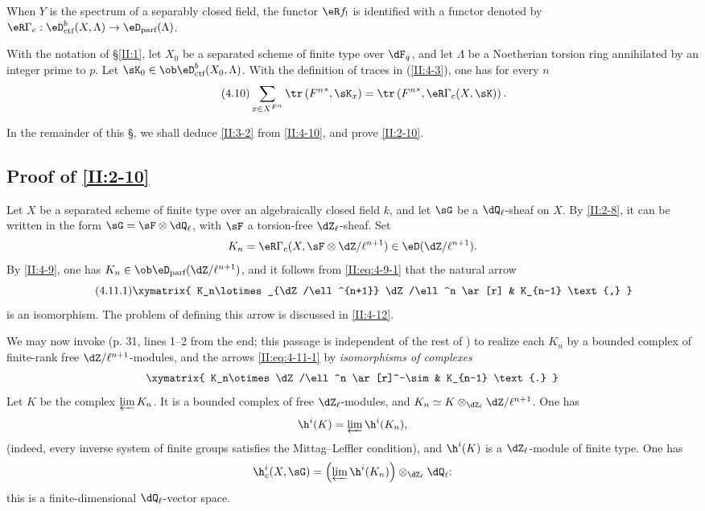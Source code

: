 When $Y$ is the spectrum of a separably closed field, the functor $\eR f_!$
is identified with a functor denoted by
$\eR \Gamma_c : \eD_\text{ctf}^b(X,\Lambda)\to\eD_\text{parf}(\Lambda)$.






\begin{theorem_}\label{II:4-10}
With the notation of \S\ref{II:1}, let $X_0$ be a separated scheme of finite
type over $\dF_q$, and let $\Lambda$ be a Noetherian torsion ring annihilated
by an integer prime to $p$. Let
$\sK_0\in\ob\eD_\textnormal{ctf}^b(X_0,\Lambda)$. With the definition of
traces in (\ref{II:4-3}), one has for every $n$
\begin{equation*}\tag{4.10}\label{II:eq:4-10}
  \sum_{x\in X^{F^n}} \tr\left({F^n}^*,\sK_x\right) = \tr\left({F^n}^*,\eR\Gamma_c(X,\sK)\right) \text{.}
\end{equation*}
\end{theorem_}

In the remainder of this \S, we shall deduce \ref{II:3-2} from
\ref{II:4-10}, and prove \ref{II:2-10}.






\subsection{Proof of \texorpdfstring{\ref{II:2-10}}{2.10}}\label{II:4-11}

Let $X$ be a separated scheme of finite type over an algebraically closed
field $k$, and let $\sG$ be a $\dQ_\ell$-sheaf on $X$. By \ref{II:2-8}, it
can be written in the form $\sG=\sF\otimes\dQ_\ell$, with $\sF$ a
torsion-free $\dZ_\ell$-sheaf. Set
\[
  K_n = \eR \Gamma_c(X,\sF\otimes\dZ/\ell^{n+1})\in\eD(\dZ/\ell^{n+1}) \text{.}
\]
By \ref{II:4-9}, one has
$K_n\in\ob\eD_\text{parf}(\dZ/\ell^{n+1})$, and it follows from
\eqref{II:eq:4-9-1} that the natural arrow
\begin{equation*}\tag{4.11.1}\label{II:eq:4-11-1}
\xymatrix{
  K_n\lotimes_{\dZ/\ell^{n+1}} \dZ/\ell^n \ar[r] & K_{n-1} \text{,}
}
\end{equation*}
is an isomorphism. The problem of defining this arrow is discussed in
\ref{II:4-12}.

We may now invoke \cite[XV.3.3]{sga5} (p. 31, lines 1--2 from the end; this
passage is independent of the rest of \cite{sga5}) to realize each $K_n$ by
a bounded complex of finite-rank free $\dZ/\ell^{n+1}$-modules, and the
arrows \eqref{II:eq:4-11-1} by \emph{isomorphisms of complexes}
\[\xymatrix{
  K_n\otimes \dZ/\ell^n \ar[r]^-\sim
    & K_{n-1} \text{.}
}\]
Let $K$ be the complex $\varprojlim K_n$. It is a bounded complex of free
$\dZ_\ell$-modules, and
$K_n\simeq K\otimes_{\dZ_\ell}\dZ/\ell^{n+1}$. One has
\[
  \h^i(K) = \varprojlim \h^i(K_n) \text{,}
\]
(indeed, every inverse system of finite groups satisfies the Mittag--Leffler
condition), and $\h^i(K)$ is a $\dZ_\ell$-module of finite type. One has
\[
  \h_c^i(X,\sG) = \left(\varprojlim \h^i(K_n) \right)\otimes_{\dZ_\ell} \dQ_\ell \text{:}
\]
this is a finite-dimensional $\dQ_\ell$-vector space.






